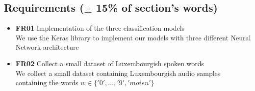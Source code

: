 \subsection{Requirements ($\pm$ 15\% of section's words)}



\begin{itemize}
  \item \textbf{FR01} Implementation of the three classification models\\
    We use the Keras library to implement our models with three
    different Neural Network architecture
  \item \textbf{FR02} Collect a small dataset of Luxembourgish spoken words\\
    We collect a small dataset containing Luxembourgish audio samples containing
    the words $w \in \{'0',\dots,'9','moien'\}$
\end{itemize}
